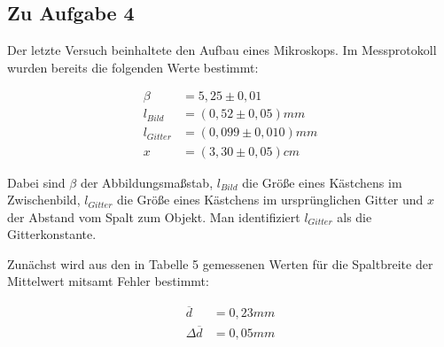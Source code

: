 \documentclass{article}
\begin{document}
\subsection{Zu Aufgabe 4}

Der letzte Versuch beinhaltete den Aufbau eines Mikroskops. Im Messprotokoll wurden bereits die folgenden Werte bestimmt:

\begin{equation}
    \begin{split}
        \beta &= 5,25 \pm 0,01 \\
        l_{Bild} &= (0,52 \pm 0,05) mm \\
        l_{Gitter} &= (0,099 \pm 0,010) mm \\
        x &= (3,30 \pm 0,05) cm
    \end{split}
\end{equation}

Dabei sind $\beta$ der Abbildungsmaßstab, $l_{Bild}$ die Größe eines Kästchens im Zwischenbild, $l_{Gitter}$ die Größe eines Kästchens im ursprünglichen Gitter und $x$ der Abstand vom Spalt zum Objekt. Man identifiziert $l_{Gitter}$ als die Gitterkonstante.

Zunächst wird aus den in Tabelle 5 gemessenen Werten für die Spaltbreite der Mittelwert mitsamt Fehler bestimmt:

\begin{equation}
    \begin{split}
        \overline{d} &= 0,23 mm \\
        \Delta \overline{d} &= 0,05mm
    \end{split}
\end{equation}





\end{document}
